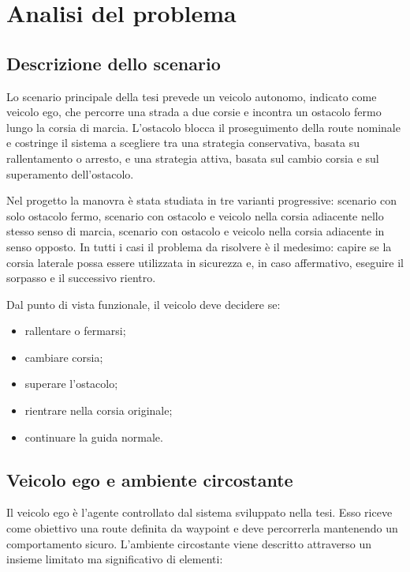 \chapter{Analisi del problema}

\section{Descrizione dello scenario}

Lo scenario principale della tesi prevede un veicolo autonomo, indicato come veicolo ego, che percorre una strada a due corsie e incontra un ostacolo fermo lungo la corsia di marcia. L'ostacolo blocca il proseguimento della route nominale e costringe il sistema a scegliere tra una strategia conservativa, basata su rallentamento o arresto, e una strategia attiva, basata sul cambio corsia e sul superamento dell'ostacolo.

Nel progetto la manovra è stata studiata in tre varianti progressive: scenario con solo ostacolo fermo, scenario con ostacolo e veicolo nella corsia adiacente nello stesso senso di marcia, scenario con ostacolo e veicolo nella corsia adiacente in senso opposto. In tutti i casi il problema da risolvere è il medesimo: capire se la corsia laterale possa essere utilizzata in sicurezza e, in caso affermativo, eseguire il sorpasso e il successivo rientro.

Dal punto di vista funzionale, il veicolo deve decidere se:

\begin{itemize}
    \item rallentare o fermarsi;
    \item cambiare corsia;
    \item superare l'ostacolo;
    \item rientrare nella corsia originale;
    \item continuare la guida normale.
\end{itemize}

\section{Veicolo ego e ambiente circostante}

Il veicolo ego è l'agente controllato dal sistema sviluppato nella tesi. Esso riceve come obiettivo una route definita da waypoint e deve percorrerla mantenendo un comportamento sicuro. L'ambiente circostante viene descritto attraverso un insieme limitato ma significativo di elementi:

